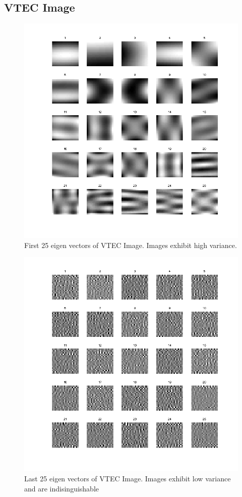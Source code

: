 \documentclass[12pt,english]{article}
\begin{document}
\subsection{VTEC Image}
\begin{figure}
    \includegraphics[width=\linewidth]{first25-VTEC-Images.png}
    \caption{First 25 eigen vectors of VTEC Image. Images exhibit high variance.}
\end{figure}

\begin{figure}
    \includegraphics[width=\linewidth]{last25-VTEC-Images.png}
    \caption{Last 25 eigen vectors of VTEC Image. Images exhibit low variance and are indisinguishable} 
\end{figure}
\end{document}
